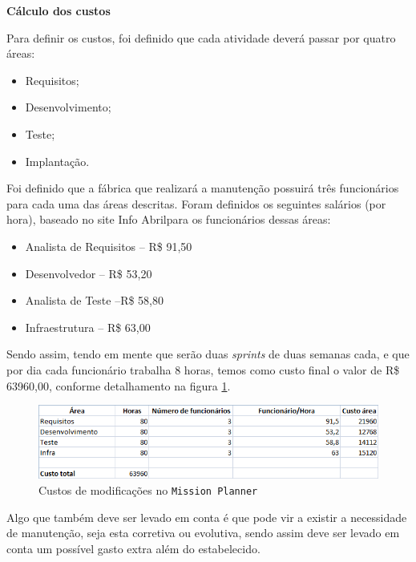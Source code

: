  \textbf{Cálculo dos custos}
 
 Para definir os custos, foi definido que cada atividade deverá passar por quatro áreas: 
\begin{itemize}
 \item Requisitos;
\item Desenvolvimento;
\item Teste;
\item Implantação.
\end{itemize}

   Foi definido que a fábrica que realizará a manutenção possuirá três funcionários para cada uma das áreas descritas. 
   Foram definidos os seguintes salários (por hora), baseado no site Info Abril\footnotemark para os funcionários dessas áreas:
\begin{itemize}
   \item Analista de Requisitos – R\$ 91,50
\item Desenvolvedor – R\$ 53,20
\item Analista de Teste –R\$ 58,80
\item Infraestrutura – R\$ 63,00
\end{itemize}

Sendo assim, tendo em mente que serão duas \textit{sprints} de duas semanas cada, 
e que por dia cada funcionário trabalha 8 horas, temos como custo final o valor de R\$ 63960,00,
conforme detalhamento na figura \ref{fig:custos_software}.
 
 \begin{figure}[H]
    \centering
	    \includegraphics[keepaspectratio=true,scale=0.8]{figuras/custos_software.png}
    \caption{Custos de modificações no \texttt{Mission Planner}}
    \label{fig:custos_software}
\end{figure}

Algo que também deve ser levado em conta é que pode vir a existir a necessidade de manutenção, seja esta corretiva ou evolutiva, 
sendo assim deve ser levado em conta um possível gasto extra além do estabelecido.
